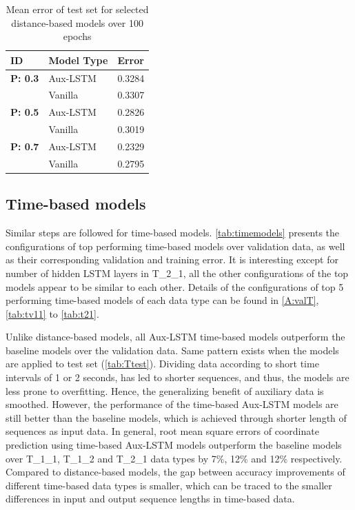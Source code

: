 \begin{table}

    \caption{Mean error of test set for selected distance-based models over 100 epochs}
    \centering
    \small\addtolength{\tabcolsep}{-3pt}
    \begin{tabular}{|l|l|l|}
    \hline
       \textbf{ID} & \textbf{Model Type}  & \textbf{Error } \\
       \hline
    
         \textbf{P: 0.3} & Aux-LSTM & 0.3284   \\
           & Vanilla & 0.3307\\
          \hline
         \textbf{P: 0.5}  &  Aux-LSTM & 0.2826  \\
           & Vanilla & 0.3019 \\
         \hline
         \textbf{P: 0.7} & Aux-LSTM & 0.2329  \\
           & Vanilla & 0.2795 \\

    \hline
    \end{tabular}
    \label{tab:Dtest}
\end{table}

\subsection{Time-based models}
Similar steps are followed for time-based models. \cref{tab:timemodels} presents the configurations of top performing time-based models over validation data, as well as their corresponding validation and training error. It is interesting except for number of hidden LSTM layers in T\_2\_1, all the other configurations of the top models appear to be similar to each other. Details of the configurations of top 5 performing time-based models of each data type can be found in \cref{A:valT}, \cref{tab:tv11} to \cref{tab:t21}. 

Unlike distance-based models, all Aux-LSTM time-based models outperform the baseline models over the validation data. Same pattern exists when the models are applied to test set (\cref{tab:Ttest}). Dividing data according to short time intervals of 1 or 2 seconds, has led to shorter sequences, and thus, the models are less prone to overfitting. Hence, the generalizing benefit of auxiliary data is smoothed. However, the performance of the time-based Aux-LSTM models are still better than the baseline models, which is achieved through shorter length of sequences as input data. In general, root mean square errors of coordinate prediction using time-based Aux-LSTM models outperform the baseline models over T\_1\_1, T\_1\_2 and T\_2\_1 data types by 7\%, 12\% and 12\% respectively. Compared to distance-based models, the gap between accuracy improvements of different time-based data types is smaller, which can be traced to the smaller differences in input and output sequence lengths in time-based data.

